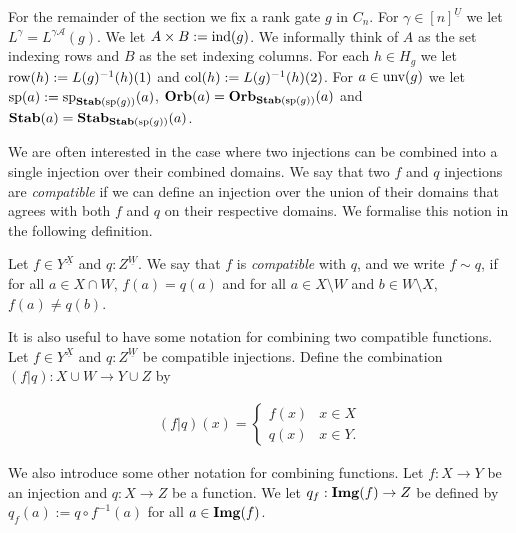 \documentclass[../paper.tex]{subfiles}
\begin{document}
For the remainder of the section we fix a rank gate $g$ in $C_n$. For $\gamma
\in [n]^{\underline{U}}$ we let $L^{\gamma} = L^{\gamma \mathcal{A}}(g)$. We let
$A \times B := \text{\upshape ind}(g)$. We informally think of $A$ as the set indexing rows and
$B$ as the set indexing columns. For each $h \in H_g$ we let $\text{row}(h) :=
L(g)^{-1}(h)(1)$ and $\text{col}(h) := L(g)^{-1}(h)(2)$. For $a \in \text{unv}(g)$
we let $\text{sp}(a) := \text{sp}_{\text{\textbf{Stab}} (\text{sp} (g))}(a)$, $\text{\textbf{Orb}}(a) = \text{\textbf{Orb}}_{\text{\textbf{Stab}} (\text{sp} (g))}(a)$
and $\text{\textbf{Stab}}(a) = \text{\textbf{Stab}}_{\text{\textbf{Stab}} (\text{sp} (g))}(a)$.

We are often interested in the case where two injections can be combined into a
single injection over their combined domains. We say that two $f$ and $q$
injections are \emph{compatible} if we can define an injection over the union of
their domains that agrees with both $f$ and $q$ on their respective domains. We
formalise this notion in the following definition.

\begin{definition}
	Let $f \in Y^{\underline{X}}$ and $q : Z^{\underline{W}}$. We say that $f$ is
  \emph{compatible} with $q$, and we write $f \sim q$, if for all $a \in X \cap
  W$, $f(a) = q(a)$ and for all $a \in X \setminus W$ and $b \in W \setminus X$,
  $f(a) \neq q(b)$.
\end{definition}

It is also useful to have some notation for combining two compatible functions.
Let $f \in Y^{\underline{X}}$ and $q : Z^{\underline{W}}$ be compatible
injections. Define the combination $(f | q): X \cup W \rightarrow Y \cup Z$ by

\begin{align*}
	(f \vert q) (x) =
	\begin{cases}
    f (x) & x \in X  \\
    q (x) & x \in Y.
	\end{cases}
\end{align*}

We also introduce some other notation for combining functions. Let $f: X
\rightarrow Y$ be an injection and $q: X \rightarrow Z$ be a function. We let
$q_f : \text{\textbf{Img}}(f) \rightarrow Z$ be defined by $q_f(a) := q \circ f^{-1}(a)$ for
all $a \in \text{\textbf{Img}}(f)$.

\end{document}
